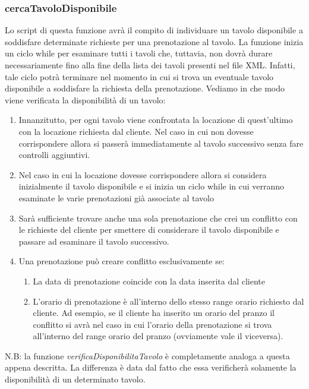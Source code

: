 \documentclass [a4paper, 12pt]{book}
\begin{document}
\subsubsection{cercaTavoloDisponibile}
Lo script di questa funzione avrà il compito di individuare un tavolo disponibile a soddisfare determinate richieste per una prenotazione al tavolo. La funzione inizia un ciclo while per esaminare tutti i tavoli che, tuttavia, non dovrà durare necessariamente fino alla fine della lista dei tavoli presenti nel file XML. Infatti, tale ciclo potrà terminare nel momento in cui si trova un eventuale tavolo disponibile a soddisfare la richiesta della prenotazione. Vediamo in che modo viene verificata la disponibilità di un tavolo:
\begin{enumerate}
\item Innanzitutto, per ogni tavolo viene confrontata la locazione di quest'ultimo con la locazione richiesta dal cliente. Nel caso in cui non dovesse corrispondere allora si passerà immediatamente al tavolo successivo senza fare controlli aggiuntivi.
\item Nel caso in cui la locazione dovesse corrispondere allora si considera inizialmente il tavolo disponibile e si inizia un ciclo while in cui verranno esaminate le varie prenotazioni già associate al tavolo
\item Sarà sufficiente trovare anche una sola prenotazione che crei un conflitto con le richieste del cliente per smettere di considerare il tavolo disponibile e passare ad esaminare il tavolo successivo.
\item Una prenotazione può creare conflitto esclusivamente se: 
\begin{enumerate}
\item La data di prenotazione coincide con la data inserita dal cliente
\item L'orario di prenotazione è all'interno dello stesso range orario richiesto dal cliente. Ad esempio, se il cliente ha inserito un orario del pranzo il conflitto si avrà nel caso in cui l'orario della prenotazione si trova all'interno del range orario del pranzo (ovviamente vale il viceversa).
\end{enumerate}
\end{enumerate}
N.B: la funzione \textit{verificaDisponibilitaTavolo} è completamente analoga a questa appena descritta. La differenza è data dal fatto che essa verificherà solamente la disponibilità di un determinato tavolo.
\end{document}
